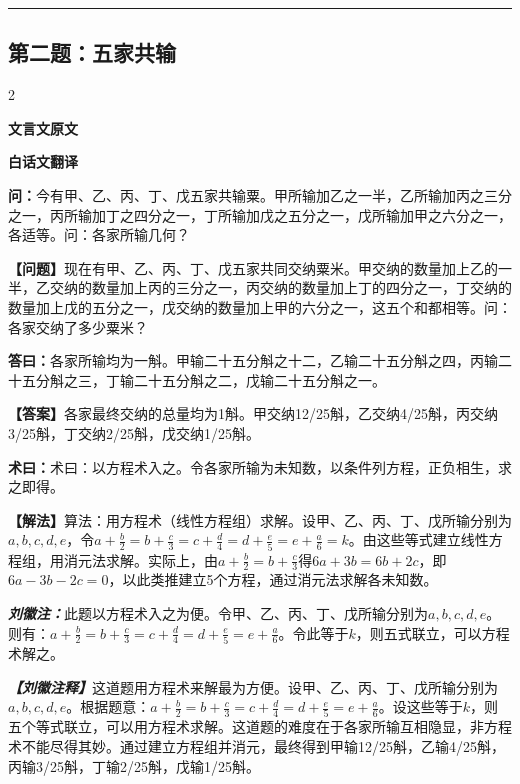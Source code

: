 \documentclass[10pt,a4paper]{article}
\newcommand{\wen}[1]{\textbf{\color{problemcolor}问：}#1\par}
\newcommand{\da}[1]{\textbf{答曰：}#1\par}
\newcommand{\shu}[1]{\textbf{术曰：}#1\par}
\newcommand{\liuhui}[1]{{\color{commentarycolor}\textit{\textbf{刘徽注：}}#1\par}}
\newcommand{\classicalheader}[1]{{\centering\large\bfseries\color{classicalcolor} #1\par\vspace{0.5em}}}
\newcommand{\wenmodern}[1]{\textbf{\color{moderncolor}【问题】}#1\par}
\newcommand{\damodern}[1]{\textbf{【答案】}#1\par}
\newcommand{\shumodern}[1]{\textbf{【解法】}#1\par}
\newcommand{\liuhuimodern}[1]{{\color{commentarycolor}\textit{\textbf{【刘徽注释】}}#1\par}}
\newcommand{\modernheader}[1]{{\centering\large\bfseries\color{moderncolor} #1\par\vspace{0.5em}}}
\newcommand{\problemsec}[1]{\subsection*{#1}}
\begin{document}
\vspace{0.3cm}
\hrule
\vspace{0.3cm}

\problemsec{第二题：五家共输}
\begin{paracol}{2}
\classicalheader{文言文原文}
\switchcolumn
\modernheader{白话文翻译}
\switchcolumn*

\wen{今有甲、乙、丙、丁、戊五家共输粟。甲所输加乙之一半，乙所输加丙之三分之一，丙所输加丁之四分之一，丁所输加戊之五分之一，戊所输加甲之六分之一，各适等。问：各家所输几何？}

\switchcolumn

\wenmodern{现在有甲、乙、丙、丁、戊五家共同交纳粟米。甲交纳的数量加上乙的一半，乙交纳的数量加上丙的三分之一，丙交纳的数量加上丁的四分之一，丁交纳的数量加上戊的五分之一，戊交纳的数量加上甲的六分之一，这五个和都相等。问：各家交纳了多少粟米？}

\switchcolumn*

\da{各家所输均为一斛。甲输二十五分斛之十二，乙输二十五分斛之四，丙输二十五分斛之三，丁输二十五分斛之二，戊输二十五分斛之一。}

\switchcolumn

\damodern{各家最终交纳的总量均为1斛。甲交纳12/25斛，乙交纳4/25斛，丙交纳3/25斛，丁交纳2/25斛，戊交纳1/25斛。}

\switchcolumn*

\shu{术曰：以方程术入之。令各家所输为未知数，以条件列方程，正负相生，求之即得。}

\switchcolumn

\shumodern{算法：用方程术（线性方程组）求解。设甲、乙、丙、丁、戊所输分别为$a,b,c,d,e$，令$a+\frac{b}{2}=b+\frac{c}{3}=c+\frac{d}{4}=d+\frac{e}{5}=e+\frac{a}{6}=k$。由这些等式建立线性方程组，用消元法求解。实际上，由$a+\frac{b}{2}=b+\frac{c}{3}$得$6a+3b=6b+2c$，即$6a-3b-2c=0$，以此类推建立5个方程，通过消元法求解各未知数。}

\switchcolumn*

\liuhui{此题以方程术入之为便。令甲、乙、丙、丁、戊所输分别为$a,b,c,d,e$。则有：$a + \frac{b}{2} = b + \frac{c}{3} = c + \frac{d}{4} = d + \frac{e}{5} = e + \frac{a}{6}$。令此等于$k$，则五式联立，可以方程术解之。}

\switchcolumn

\liuhuimodern{这道题用方程术来解最为方便。设甲、乙、丙、丁、戊所输分别为$a,b,c,d,e$。根据题意：$a+\frac{b}{2}=b+\frac{c}{3}=c+\frac{d}{4}=d+\frac{e}{5}=e+\frac{a}{6}$。设这些等于$k$，则五个等式联立，可以用方程术求解。这道题的难度在于各家所输互相隐显，非方程术不能尽得其妙。通过建立方程组并消元，最终得到甲输12/25斛，乙输4/25斛，丙输3/25斛，丁输2/25斛，戊输1/25斛。}

\end{paracol}
\end{document}
